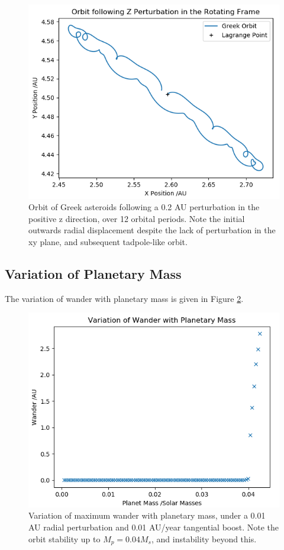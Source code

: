 \documentclass[11pt, a4paper,twocolumn]{article} %
\begin{document}
\begin{figure}
	\centering
	\includegraphics[width=0.8\linewidth]{Figures/z_perturb_orbit}
	\caption{Orbit of Greek asteroids following a 0.2 AU perturbation in the positive z direction, over 12 orbital periods. Note the initial outwards radial displacement despite the lack of perturbation in the xy plane, and subsequent tadpole-like orbit.}
	\label{fig:zorbit}
\end{figure}

\subsection{Variation of Planetary Mass} \label{planet}
The variation of wander with planetary mass is given in Figure \ref{fig:planetmass}.

\begin{figure}
	\centering
	\includegraphics[width=0.8\linewidth]{Figures/wanderwithplanetmass_p6}
	\caption{Variation of maximum wander with planetary mass, under a 0.01 AU radial perturbation and 0.01 AU/year tangential boost. Note the orbit stability up to $ M_{p} = 0.04 M_{s}$, and instability beyond this.}
	\label{fig:planetmass}
\end{figure}
\end{document}
